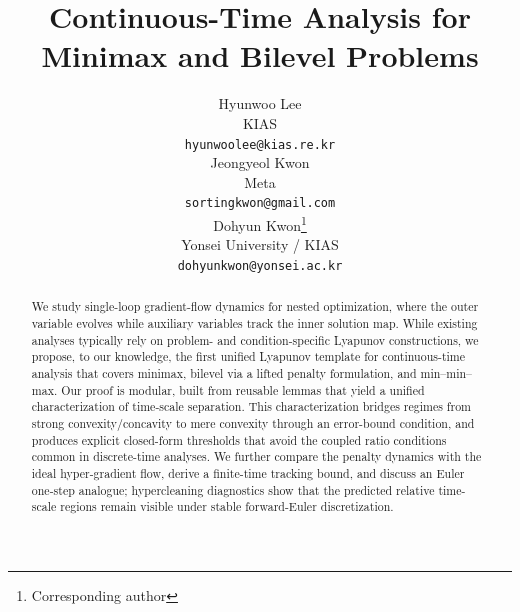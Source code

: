 \documentclass{article}
\title{Continuous-Time Analysis for Minimax and Bilevel Problems}
\author{%
  Hyunwoo Lee \\
  KIAS\\
  \texttt{hyunwoolee@kias.re.kr} \\
  \And
  Jeongyeol Kwon \\
  Meta \\
  \texttt{sortingkwon@gmail.com} \\
  \And
  Dohyun Kwon\thanks{Corresponding author} \\
  Yonsei University / KIAS \\
  \texttt{dohyunkwon@yonsei.ac.kr} \\
}
\newcommand{\1}{\mathbf{1}}
\begin{document}
\maketitle


\begin{abstract}
We study single-loop gradient-flow dynamics for nested optimization, where the outer variable evolves while auxiliary variables track the inner solution map.
While existing analyses typically rely on problem- and condition-specific Lyapunov constructions, we propose, to our knowledge, the first unified Lyapunov template for continuous-time analysis that covers minimax, bilevel via a lifted penalty formulation, and min--min--max. 
Our proof is modular, built from reusable lemmas that yield a unified characterization of time-scale separation. This characterization bridges regimes from strong convexity/concavity to mere convexity through an error-bound condition, and produces explicit closed-form thresholds that avoid the coupled ratio conditions common in discrete-time analyses. We further compare the penalty dynamics with the ideal hyper-gradient flow, derive a finite-time tracking bound, and discuss an Euler one-step analogue; hypercleaning diagnostics show that the predicted relative time-scale regions remain visible under stable forward-Euler discretization.

\end{abstract}
\end{document}
